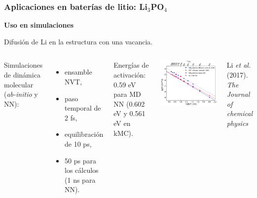 \documentclass[aspectratio=169]{beamer}
\let\oldtextbf\textbf
\renewcommand{\textbf}[1]{\textcolor{nordblue}{\oldtextbf{#1}}}
\begin{document}
    \begin{frame}
        \frametitle{Aplicaciones en baterías de litio: Li$_3$PO$_4$}
            
        \textbf{Uso en simulaciones}

        Difusión de Li en la estructura con una vacancia.
        
        \begin{columns}
            Simulaciones de dinámica molecular (\textit{ab-initio} y NN):
            \begin{itemize}
                \item ensamble NVT,
                \item paso temporal de 2 fs,
                \item equilibración de 10 ps,
                \item 50 ps para los cálculos (1 ns para NN).
            \end{itemize}

            Energías de activación: 0.59 eV para MD NN (0.602 eV y 0.561 eV en 
            kMC). 
            \begin{center}
                \includegraphics[width=0.9\columnwidth]{Li3PO4-kMC-arrhenius.png}
            \end{center}
            \tiny{Li \textit{et al.} (2017). \textit{The Journal of chemical
            physics}}
        \end{columns}

    \end{frame}
    
\end{document}
